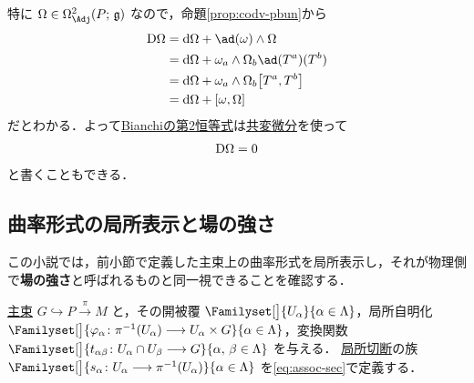 \documentclass[TQFT_main]{subfiles}
\begin{document}
特に $\Omega \in \Omega^2_{\Adj} (P;\, \mathfrak{g})$ なので，命題\ref{prop:codv-pbun}から
\begin{align}
    \codd{\Omega} 
    &= \dd{\Omega} + \ad (\omega) \wedge \Omega \\
    &= \dd{\Omega} + \omega_a \wedge \Omega_b\ad(T^a)(T^b) \\
    &= \dd{\Omega} + \omega_a \wedge \Omega_b \comm{T^a}{T^b} \\
    &= \dd{\Omega} + \comm{\omega}{\Omega}
\end{align}
だとわかる．よって\hyperref[thm:curvature]{Bianchiの第2恒等式}は\hyperref[def:codv-pbun]{共変微分}を使って
\begin{align}
    \label{eq:Bianchi-second}
    \mathrm{D}\Omega = 0
\end{align}
と書くこともできる．

\subsection{曲率形式の局所表示と場の強さ}

この小説では，前小節で定義した主束上の曲率形式を局所表示し，それが物理側で\textbf{場の強さ}と呼ばれるものと同一視できることを確認する．

\hyperref[def.PFD]{主束} $G \hookrightarrow P \xrightarrow{\pi} M$ と，その開被覆 $\Familyset[\big]{U_\alpha}{\alpha \in \Lambda}$，局所自明化 $\Familyset[\big]{\varphi_\alpha \colon \pi^{-1}(U_\alpha) \lto U_\alpha \times G}{\alpha \in \Lambda}$，変換関数 $\Familyset[\big]{t_{\alpha\beta} \colon U_\alpha \cap U_\beta \lto G}{\alpha,\, \beta \in \Lambda}$ を与える．
\hyperref[def.section]{局所切断}の族 $\Familyset[\big]{s_\alpha \colon U_\alpha \lto \pi^{-1}(U_\alpha)}{\alpha \in \Lambda}$ を\eqref{eq:assoc-sec}で定義する． 
\end{document}
